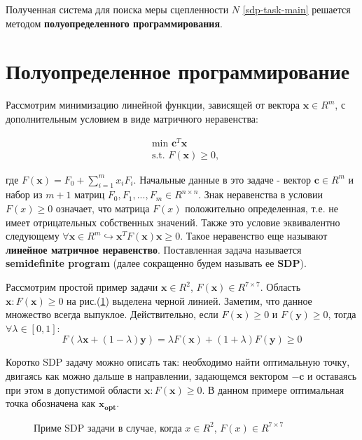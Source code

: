 Полученная система для поиска меры сцепленности $N$ \ref{sdp-task-main} решается методом \textbf{полуопределенного программирования}.


\section{Полуопределенное программирование}
Рассмотрим минимизацию линейной функции, зависящей от вектора $\bm{x} \in R^m$,
с дополнительным условием в виде матричного неравенства:

\begin{equation}\label{sdp-problem-def}
\begin{split}
    & \text{min }\bm{c}^T \bm{x}  \\
    & \text{s.t. } F(\bm{x} ) \geq 0,
\end{split}
\end{equation}

где $F(\bm{x}) = F_0 + \sum\limits_{i=1}^{m} x_i F_i$. Начальные данные в 
это задаче - вектор  $\bm{c} \in R^m$ и набор из $m+1$ матриц 
$F_0, F_1, ..., F_m \in R^{n \times n}$. Знак неравенства в условии 
$F(x) \geq 0$ означает, что матрица $F(x)$ положительно определенная, 
т.е. не имеет отрицательных собственных значений.
Также это условие эквивалентно следующему
$\forall \bm{x} \in R^m \hookrightarrow \bm{x}^TF(\bm{x})\bm{x} \geq 0$.
Такое неравенство еще называют \textbf{линейное матричное неравенство}.
Поставленная задача называется  \textbf{semidefinite program}
(далее сокращенно будем называть ее \textbf{SDP}).

Рассмотрим простой пример задачи $\bm{x}\in R^2$, $F(\bm{x})\in R^{7 \times 7}$.
Область $\bm{x}: F(\bm{x}) \geq 0$ на рис.(\ref{ris:sdp-example}) выделена черной линией.
Заметим, что данное множество всегда выпуклое.
Действительно, если $F(\bm{x}) \geq 0$ и $F(\bm{y}) \geq 0$,
тогда $\forall \lambda \in [0, 1]$:
\begin{equation}\label{sdp-convex}
F(\lambda \bm{x} + (1-\lambda) \bm{y})=
\lambda F(\bm{x}) + (1+\lambda) F(\bm{y}) \geq 0
\end{equation}

Коротко SDP задачу можно описать так: необходимо найти оптимальную точку, двигаясь как можно дальше в направлении, 
задающемся вектором $- \bm{c}$ и оставаясь при этом в допустимой области $\bm{x}: F(\bm{x}) \geq 0$.
В данном примере оптимальная точка обозначена как $\bm{x_{opt}}$.
\begin{figure}[h]
\caption{Приме SDP задачи в случае, когда $x\in R^2$, $F(x)\in R^{7 \times 7}$}
\label{ris:sdp-example}
\end{figure}

